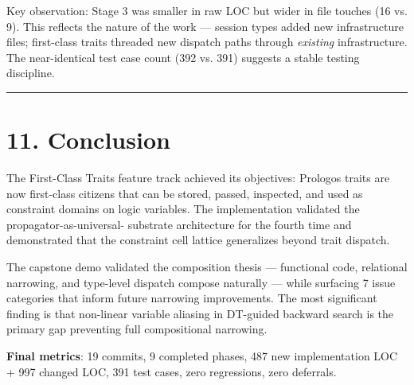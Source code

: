 \documentclass[11pt]{article}
\begin{document}
Key observation: Stage 3 was smaller in raw LOC but wider in file touches (16 vs. 9).
This reflects the nature of the work — session types added new infrastructure files;
first-class traits threaded new dispatch paths through \emph{existing} infrastructure.
The near-identical test case count (392 vs. 391) suggests a stable testing discipline.

\noindent\rule{\textwidth}{0.5pt}
\section{11. Conclusion}
\label{sec:orgf56688f}

The First-Class Traits feature track achieved its objectives: Prologos traits are
now first-class citizens that can be stored, passed, inspected, and used as constraint
domains on logic variables. The implementation validated the propagator-as-universal-
substrate architecture for the fourth time and demonstrated that the constraint cell
lattice generalizes beyond trait dispatch.

The capstone demo validated the composition thesis — functional code, relational
narrowing, and type-level dispatch compose naturally — while surfacing 7 issue
categories that inform future narrowing improvements. The most significant finding
is that non-linear variable aliasing in DT-guided backward search is the primary
gap preventing full compositional narrowing.

\textbf{Final metrics}: 19 commits, 9 completed phases, 487 new implementation LOC + 997
changed LOC, 391 test cases, zero regressions, zero deferrals.
\end{document}
